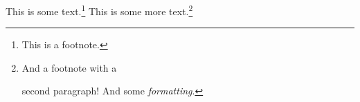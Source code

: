 \documentclass{article}
\begin{document}
  This is some text.\footnote{This is a footnote.} This is some more text.\footnote{And a footnote with a

  second paragraph! And some \emph{formatting}.}
\end{document}
